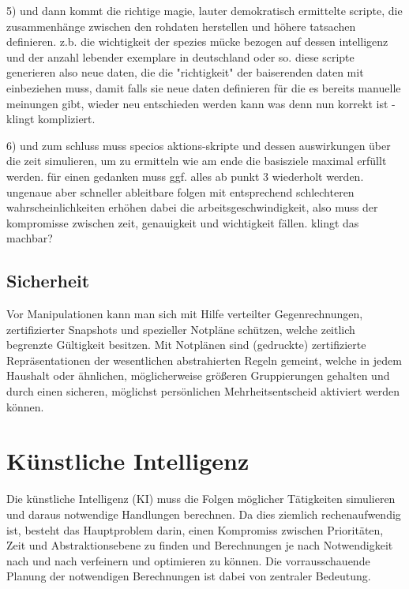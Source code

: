 5) und dann kommt die richtige magie, lauter demokratisch ermittelte scripte, die zusammenhänge zwischen den rohdaten herstellen und höhere tatsachen definieren. z.b. die wichtigkeit der spezies mücke bezogen auf dessen intelligenz und der anzahl lebender exemplare in deutschland oder so. diese scripte generieren also neue daten, die die "richtigkeit" der baiserenden daten mit einbeziehen muss, damit falls sie neue daten definieren für die es bereits manuelle meinungen gibt, wieder neu entschieden werden kann was denn nun korrekt ist - klingt kompliziert.

6) und zum schluss muss specios aktions-skripte und dessen auswirkungen über die zeit simulieren, um zu ermitteln wie am ende die basisziele maximal erfüllt werden. für einen gedanken muss ggf. alles ab punkt 3 wiederholt werden. ungenaue aber schneller ableitbare folgen mit entsprechend schlechteren wahrscheinlichkeiten erhöhen dabei die arbeitsgeschwindigkeit, also muss der kompromisse zwischen zeit, genauigkeit und wichtigkeit fällen.
klingt das machbar?

\subsection{Sicherheit}\label{sec:maintenance/security}

Vor Manipulationen kann man sich mit Hilfe verteilter Gegenrechnungen, zertifizierter Snapshots und spezieller Notpläne schützen, welche zeitlich begrenzte Gültigkeit besitzen. Mit Notplänen sind (gedruckte) zertifizierte Repräsentationen der wesentlichen abstrahierten Regeln gemeint, welche in jedem Haushalt oder ähnlichen, möglicherweise größeren Gruppierungen gehalten und durch einen sicheren, möglichst persönlichen Mehrheitsentscheid aktiviert werden können.

\section{Künstliche Intelligenz}\label{sec:ki}

Die künstliche Intelligenz (KI) muss die Folgen möglicher Tätigkeiten simulieren und daraus notwendige Handlungen berechnen. Da dies ziemlich rechenaufwendig ist, besteht das Hauptproblem darin, einen Kompromiss zwischen Prioritäten, Zeit und Abstraktionsebene zu finden und Berechnungen je nach Notwendigkeit nach und nach verfeinern und optimieren zu können. Die vorrausschauende Planung der notwendigen Berechnungen ist dabei von zentraler Bedeutung.

